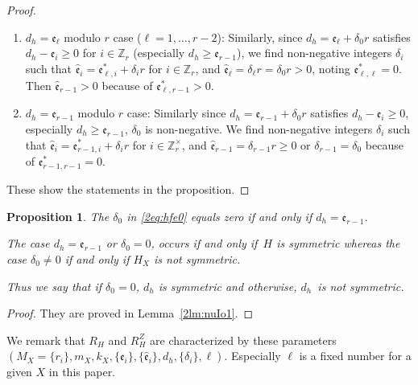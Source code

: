 \documentclass[pdftex]{sigma}
\def\ZZ{{\mathbb Z}}
\def\fe{{\mathfrak e}}
\def\hfe{{\widehat{\mathfrak e}}}
\numberwithin{equation}{section}
\newtheorem{Proposition}[Theorem]{Proposition}
 { \theoremstyle{definition}
\newtheorem{Definition}[Theorem]{Definition}
\newtheorem{Note}[Theorem]{Note}
\newtheorem{Example}[Theorem]{Example}
\newtheorem{Remark}[Theorem]{Remark} }
\begin{document}
\begin{proof}
\begin{enumerate}
\item $d_h = \fe_\ell$ modulo $r$ case ($\ell = 1, \dots, r-2$):
Similarly, since $d_h = \fe_\ell + \delta_0 r$ satisfies $d_h - \fe_i\ge0$ for $i \in \ZZ_r$ (especially $d_h \ge \fe_{r-1}$), we find non-negative integers $\delta_i$ such that $\hfe_i =\fe_{\ell,i}^* + \delta_i r$ for $i \in \ZZ_r$, and $\hfe_\ell = \delta_\ell r=\delta_0 r>0$, noting $\fe_{\ell,\ell}^*=0$.
Then $\hfe_{r-1}>0$ because of $\fe_{\ell,r-1}^*>0$.

\item $d_h = \fe_{r-1}$ modulo $r$ case:
Similarly since $d_h = \fe_{r-1} + \delta_0 r$ satisfies $d_h - \fe_i\ge0$, especially $d_h \ge \fe_{r-1}$, $\delta_0$ is non-negative.
We find non-negative integers $\delta_i$ such that $\hfe_i =\fe_{r-1,i}^* + \delta_i r$ for $i \in \ZZ_r^\times$, and $\hfe_{r-1} = \delta_{r-1} r\ge 0$ or $\delta_{r-1}=\delta_0$ because of $\fe_{r-1,r-1}^*=0$.
\end{enumerate}
These show the statements in the proposition.
\end{proof}

\begin{Proposition}\label{2pr:dh_symmetric}
The $\delta_0$ in \eqref{2eq:hfe0} equals zero if and only if $d_h = \fe_{r-1}$.

The case $d_h = \fe_{r-1}$ or $\delta_0=0$, occurs if and only if~$H$ is symmetric whereas
the case $\delta_0\neq 0$ if and only if $H_X$ is not symmetric.

Thus we say that if $\delta_0=0$, $d_h$ is symmetric and otherwise, $d_h$~is not symmetric.
\end{Proposition}

\begin{proof}They are proved in Lemma~\ref{2lm:nuIo1}.
\end{proof}

\begin{Remark}\label{2rm:R_Hparameters}
We remark that $R_H$ and $R_H^Z$ are characterized by these parameters $(M_X=\{r_i\},\allowbreak m_X, k_X, \{\fe_i\},\{\hfe_i\},d_h, \{\delta_i\}, \ell)$.
Especially $\ell$ is a fixed number for a given $X$ in this paper.
\end{Remark}
\end{document}
